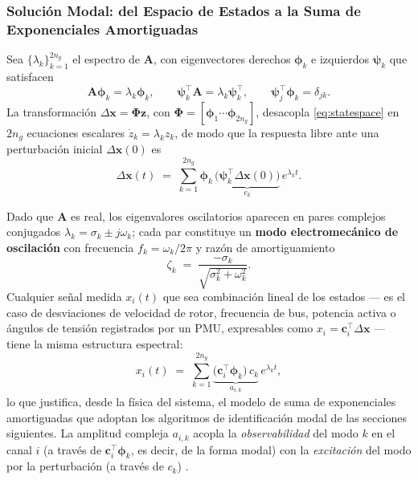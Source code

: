 
\subsubsection{Solución Modal: del Espacio de Estados a la Suma de
Exponenciales Amortiguadas}

Sea $\{\lambda_k\}_{k=1}^{2n_g}$ el espectro de $\mathbf{A}$, con
eigenvectores derechos $\boldsymbol{\phi}_k$ e izquierdos
$\boldsymbol{\psi}_k$ que satisfacen
\begin{equation}
    \mathbf{A}\boldsymbol{\phi}_k = \lambda_k \boldsymbol{\phi}_k,
    \qquad
    \boldsymbol{\psi}_k^\top \mathbf{A} = \lambda_k \boldsymbol{\psi}_k^\top,
    \qquad
    \boldsymbol{\psi}_j^\top\boldsymbol{\phi}_k = \delta_{jk}.
    \label{eq:eigen}
\end{equation}
La transformación $\Delta\mathbf{x} = \boldsymbol{\Phi}\mathbf{z}$,
con $\boldsymbol{\Phi}=[\boldsymbol{\phi}_1 \cdots \boldsymbol{\phi}_{2n_g}]$,
desacopla \eqref{eq:statespace} en $2n_g$ ecuaciones escalares
$\dot{z}_k = \lambda_k z_k$, de modo que la respuesta libre ante una
perturbación inicial $\Delta\mathbf{x}(0)$ es \cite{kundur1994}
\begin{equation}
    \Delta\mathbf{x}(t)
    \;=\;
    \sum_{k=1}^{2n_g} \boldsymbol{\phi}_k\,
    \underbrace{\bigl(\boldsymbol{\psi}_k^\top \Delta\mathbf{x}(0)\bigr)}_{c_k}\,
    e^{\lambda_k t}.
    \label{eq:modal_response}
\end{equation}

Dado que $\mathbf{A}$ es real, los eigenvalores oscilatorios aparecen en
pares complejos conjugados $\lambda_k = \sigma_k \pm j\omega_k$; cada par
constituye un \textbf{modo electromecánico de oscilación} con frecuencia
$f_k = \omega_k/2\pi$ y razón de amortiguamiento
\begin{equation}
    \zeta_k \;=\; \frac{-\sigma_k}{\sqrt{\sigma_k^2 + \omega_k^2}}.
    \label{eq:damping_ratio}
\end{equation}
Cualquier señal medida $x_i(t)$ que sea combinación lineal de los estados
--- es el caso de desviaciones de velocidad de rotor, frecuencia de bus,
potencia activa o ángulos de tensión registrados por un PMU, expresables
como $x_i = \mathbf{c}_i^\top\Delta\mathbf{x}$ --- tiene la misma
estructura espectral:
\begin{equation}
    x_i(t) \;=\; \sum_{k=1}^{2n_g}
    \underbrace{\bigl(\mathbf{c}_i^\top\boldsymbol{\phi}_k\bigr)\,c_k}_{a_{i,k}}\,
    e^{\lambda_k t},
    \label{eq:measured_modal}
\end{equation}
lo que justifica, desde la física del sistema, el modelo de suma de
exponenciales amortiguadas que adoptan los algoritmos de identificación
modal de las secciones siguientes. La amplitud compleja $a_{i,k}$ acopla la
\textit{observabilidad} del modo $k$ en el canal $i$
(a través de $\mathbf{c}_i^\top\boldsymbol{\phi}_k$, es decir, de la forma
modal) con la \textit{excitación} del modo por la perturbación
(a través de $c_k$) \cite{kundur1994}.

